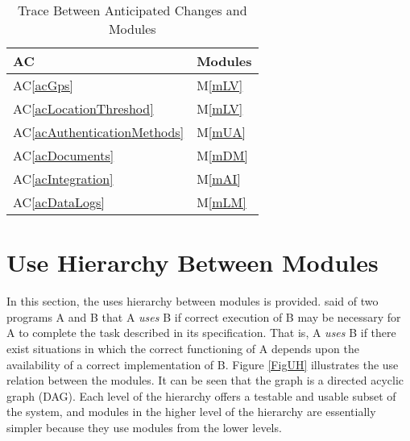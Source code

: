 \documentclass[12pt, titlepage]{article}
\newcommand{\acref}[1]{AC\ref{#1}}
\newcommand{\mref}[1]{M\ref{#1}}
\begin{document}
\begin{table}[H]
  \centering
  \begin{tabular}{p{} p{}}
    \toprule
    \textbf{AC}                        & \textbf{Modules} \\
    \midrule
    \acref{acGps}                      & \mref{mLV} \\
    \acref{acLocationThreshod}         & \mref{mLV} \\
    \acref{acAuthenticationMethods}    & \mref{mUA} \\
    \acref{acDocuments}                & \mref{mDM} \\
    \acref{acIntegration}              & \mref{mAI} \\
    \acref{acDataLogs}                 & \mref{mLM} \\
    \bottomrule
  \end{tabular}
  \caption{Trace Between Anticipated Changes and Modules}
  \label{TblACT}
\end{table}

\section{Use Hierarchy Between Modules} \label{SecUse}

In this section, the uses hierarchy between modules is
provided. \citet{Parnas1978} said of two programs A and B that A {\em uses} B if
correct execution of B may be necessary for A to complete the task described in
its specification. That is, A {\em uses} B if there exist situations in which
the correct functioning of A depends upon the availability of a correct
implementation of B.  Figure \ref{FigUH} illustrates the use relation between
the modules. It can be seen that the graph is a directed acyclic graph
(DAG). Each level of the hierarchy offers a testable and usable subset of the
system, and modules in the higher level of the hierarchy are essentially simpler
because they use modules from the lower levels.

\end{document}

